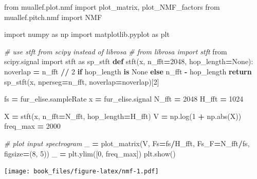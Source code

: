 \documentclass[american,]{article}
\newenvironment{Shaded}{\begin{snugshade}}{\end{snugshade}}
\newcommand{\BuiltInTok}[1]{#1}
\newcommand{\CommentTok}[1]{\textcolor[rgb]{0.56,0.35,0.01}{\textit{#1}}}
\newcommand{\ControlFlowTok}[1]{\textcolor[rgb]{0.13,0.29,0.53}{\textbf{#1}}}
\newcommand{\DecValTok}[1]{\textcolor[rgb]{0.00,0.00,0.81}{#1}}
\newcommand{\ImportTok}[1]{#1}
\newcommand{\KeywordTok}[1]{\textcolor[rgb]{0.13,0.29,0.53}{\textbf{#1}}}
\newcommand{\NormalTok}[1]{#1}
\newcommand{\OperatorTok}[1]{\textcolor[rgb]{0.81,0.36,0.00}{\textbf{#1}}}
\newcommand{\VariableTok}[1]{\textcolor[rgb]{0.00,0.00,0.00}{#1}}
\begin{document}
\begin{Shaded}
\begin{Highlighting}[]
\ImportTok{from}\NormalTok{ muallef.plot.nmf }\ImportTok{import}\NormalTok{ plot_matrix, plot_NMF_factors}
\ImportTok{from}\NormalTok{ muallef.pitch.nmf }\ImportTok{import}\NormalTok{ NMF}

\ImportTok{import}\NormalTok{ numpy }\ImportTok{as}\NormalTok{ np}
\ImportTok{import}\NormalTok{ matplotlib.pyplot }\ImportTok{as}\NormalTok{ plt}

\CommentTok{# use stft from scipy instead of librosa}
\CommentTok{# from librosa import stft}
\ImportTok{from}\NormalTok{ scipy.signal }\ImportTok{import}\NormalTok{ stft }\ImportTok{as}\NormalTok{ sp_stft}
\KeywordTok{def}\NormalTok{ stft(x, n_fft}\OperatorTok{=}\DecValTok{2048}\NormalTok{, hop_length}\OperatorTok{=}\VariableTok{None}\NormalTok{):}
\NormalTok{    noverlap }\OperatorTok{=}\NormalTok{ n_fft }\OperatorTok{//} \DecValTok{2} \ControlFlowTok{if}\NormalTok{ hop_length }\KeywordTok{is} \VariableTok{None} \ControlFlowTok{else}\NormalTok{ n_fft }\OperatorTok{-}\NormalTok{ hop_length}
    \ControlFlowTok{return}\NormalTok{ sp_stft(x, nperseg}\OperatorTok{=}\NormalTok{n_fft, noverlap}\OperatorTok{=}\NormalTok{noverlap)[}\DecValTok{2}\NormalTok{]}

\NormalTok{fs }\OperatorTok{=}\NormalTok{ fur_elise.sampleRate}
\NormalTok{x }\OperatorTok{=}\NormalTok{ fur_elise.signal}
\NormalTok{N_fft }\OperatorTok{=} \DecValTok{2048}
\NormalTok{H_fft }\OperatorTok{=} \DecValTok{1024}

\NormalTok{X }\OperatorTok{=}\NormalTok{ stft(x, n_fft}\OperatorTok{=}\NormalTok{N_fft, hop_length}\OperatorTok{=}\NormalTok{H_fft)}
\NormalTok{V }\OperatorTok{=}\NormalTok{ np.log(}\DecValTok{1} \OperatorTok{+}\NormalTok{ np.}\BuiltInTok{abs}\NormalTok{(X))}
\NormalTok{freq_max }\OperatorTok{=} \DecValTok{2000}

\CommentTok{# plot input spectrogram}
\NormalTok{_ }\OperatorTok{=}\NormalTok{ plot_matrix(V, Fs}\OperatorTok{=}\NormalTok{fs}\OperatorTok{/}\NormalTok{H_fft, Fs_F}\OperatorTok{=}\NormalTok{N_fft}\OperatorTok{/}\NormalTok{fs, figsize}\OperatorTok{=}\NormalTok{(}\DecValTok{8}\NormalTok{, }\DecValTok{5}\NormalTok{))}
\NormalTok{_ }\OperatorTok{=}\NormalTok{ plt.ylim([}\DecValTok{0}\NormalTok{, freq_max])}
\NormalTok{plt.show()}
\end{Highlighting}
\end{Shaded}

\texttt{[image: book\_files/figure-latex/nmf-1.pdf]}
\end{document}
